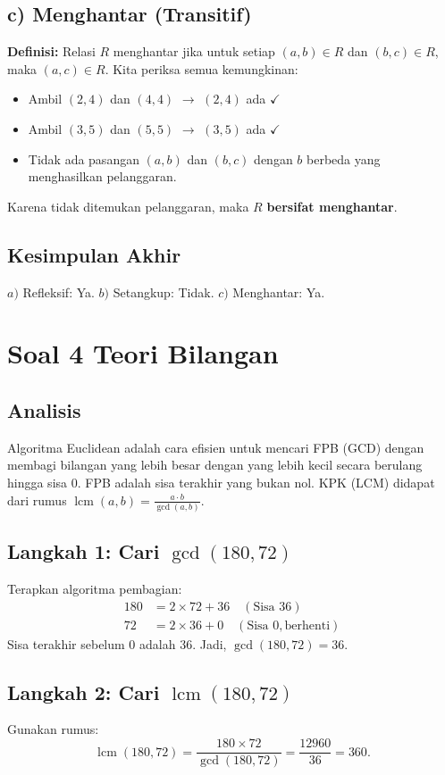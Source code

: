 \documentclass[12pt,a4paper]{article}
\begin{document}
\subsection*{c) Menghantar (Transitif)}
\textbf{Definisi:} Relasi $R$ menghantar jika untuk setiap $(a,b) \in R$ dan $(b,c) \in R$, maka $(a,c) \in R$.
Kita periksa semua kemungkinan:
\begin{itemize}
    \item Ambil $(2,4)$ dan $(4,4)$ $\rightarrow$ $(2,4)$ ada $\checkmark$
    \item Ambil $(3,5)$ dan $(5,5)$ $\rightarrow$ $(3,5)$ ada $\checkmark$
    \item Tidak ada pasangan $(a,b)$ dan $(b,c)$ dengan $b$ berbeda yang menghasilkan pelanggaran.
\end{itemize}
Karena tidak ditemukan pelanggaran, maka $R$ \textbf{bersifat menghantar}.

\subsection*{Kesimpulan Akhir}
$a)$ Refleksif: Ya. \quad $b)$ Setangkup: Tidak. \quad $c)$ Menghantar: Ya. 

\newpage
\section*{Soal 4 Teori Bilangan}
\subsection*{Analisis}
Algoritma Euclidean adalah cara efisien untuk mencari FPB (GCD) dengan membagi bilangan yang lebih besar dengan yang lebih kecil secara berulang hingga sisa 0. FPB adalah sisa terakhir yang bukan nol. KPK (LCM) didapat dari rumus $\operatorname{lcm}(a,b) = \frac{a \cdot b}{\gcd(a,b)}$.

\subsection*{Langkah 1: Cari $\gcd(180, 72)$}
Terapkan algoritma pembagian:
\begin{align*}
180 &= 2 \times 72 + 36 \quad (\text{Sisa } 36) \\
72  &= 2 \times 36 + 0 \quad (\text{Sisa } 0, \text{berhenti})
\end{align*}
Sisa terakhir sebelum 0 adalah 36. Jadi, $\gcd(180,72) = 36$.

\subsection*{Langkah 2: Cari $\operatorname{lcm}(180, 72)$}
Gunakan rumus:
\[
\operatorname{lcm}(180,72) = \frac{180 \times 72}{\gcd(180,72)} = \frac{12960}{36} = 360.
\]
\end{document}
